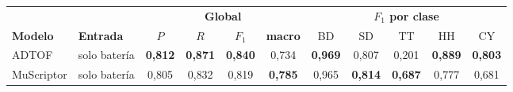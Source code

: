 \begin{tabular}{llcccc|ccccc}
\toprule
& & \multicolumn{4}{c|}{\textbf{Global}} & \multicolumn{5}{c}{\textbf{$F_1$ por clase}} \\
\textbf{Modelo} & \textbf{Entrada} & $P$ & $R$ & $F_1$ & \textbf{macro} & BD & SD & TT & HH & CY \\
\midrule
ADTOF & solo batería & \textbf{0{,}812} & \textbf{0{,}871} & \textbf{0{,}840} & 0{,}734 & \textbf{0{,}969} & 0{,}807 & 0{,}201 & \textbf{0{,}889} & \textbf{0{,}803} \\
MuScriptor & solo batería & 0{,}805 & 0{,}832 & 0{,}819 & \textbf{0{,}785} & 0{,}965 & \textbf{0{,}814} & \textbf{0{,}687} & 0{,}777 & 0{,}681 \\
\bottomrule
\end{tabular}
